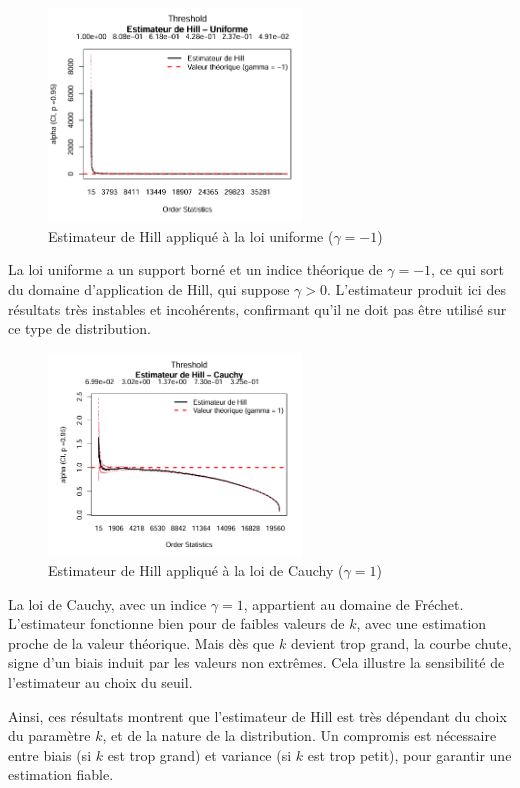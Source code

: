 \documentclass{article}
\theoremstyle{plain}
\theoremstyle{definition}
\theoremstyle{plain}
\begin{document}
\begin{figure}[H]
    \centering
    \includegraphics[width=0.6\textwidth]{./image_hill_pickands/uniforme_hill.png}
    \caption{Estimateur de Hill appliqué à la loi uniforme ($\gamma = -1$)}
\end{figure}
La loi uniforme a un support borné et un indice théorique de \(\gamma = -1\), ce qui sort du domaine d’application de Hill, qui suppose \(\gamma > 0\). L’estimateur produit ici des résultats très instables et incohérents, confirmant qu’il ne doit pas être utilisé sur ce type de distribution.

\begin{figure}[H]
    \centering
    \includegraphics[width=0.6\textwidth]{./image_hill_pickands/cauchy_hill.png}
    \caption{Estimateur de Hill appliqué à la loi de Cauchy ($\gamma = 1$)}
\end{figure}
La loi de Cauchy, avec un indice \(\gamma = 1\), appartient au domaine de Fréchet. L’estimateur fonctionne bien pour de faibles valeurs de \(k\), avec une estimation proche de la valeur théorique. Mais dès que \(k\) devient trop grand, la courbe chute, signe d’un biais induit par les valeurs non extrêmes. Cela illustre la sensibilité de l’estimateur au choix du seuil.

\medskip
\noindent
Ainsi, ces résultats montrent que l’estimateur de Hill est très dépendant du choix du paramètre \(k\), et de la nature de la distribution. Un compromis est nécessaire entre biais (si \(k\) est trop grand) et variance (si \(k\) est trop petit), pour garantir une estimation fiable.
\end{document}
